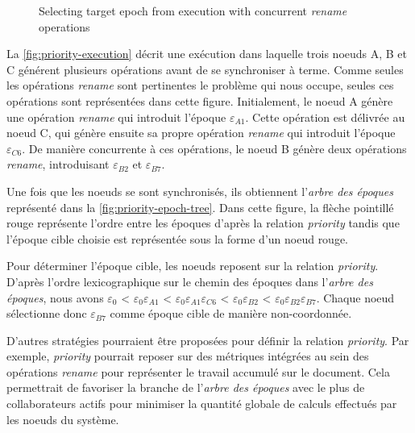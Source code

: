 \documentclass[12pt]{thesul}
\newcommand{\epoch}[1]{$\varepsilon_{#1}$}
\begin{document}
\begin{figure}[!ht]
{\begin{minipage}{\linewidth}
          \label{fig:priority-epoch-tree}
      \end{minipage}}
  \caption{Selecting target epoch from execution with concurrent \emph{rename} operations}
  \label{fig:priority-example}
\end{figure}

La \autoref{fig:priority-execution} décrit une exécution dans laquelle trois noeuds A, B et C générent plusieurs opérations avant de se synchroniser à terme.
Comme seules les opérations \emph{rename} sont pertinentes le problème qui nous occupe, seules ces opérations sont représentées dans cette figure.
Initialement, le noeud A génère une opération \emph{rename} qui introduit l'époque \epoch{A1}.
Cette opération est délivrée au noeud C, qui génère ensuite sa propre opération \emph{rename} qui introduit l'époque \epoch{C6}.
De manière concurrente à ces opérations, le noeud B génère deux opérations \emph{rename}, introduisant \epoch{B2} et \epoch{B7}.

Une fois que les noeuds se sont synchronisés, ils obtiennent l'\emph{arbre des époques} représenté dans la \autoref{fig:priority-epoch-tree}.
Dans cette figure, la flèche pointillé rouge représente l'ordre entre les époques d'après la relation \emph{priority} tandis que l'époque cible choisie est représentée sous la forme d'un noeud rouge.

Pour déterminer l'époque cible, les noeuds reposent sur la relation \emph{priority}.
D'après l'ordre lexicographique sur le chemin des époques dans l'\emph{arbre des époques}, nous avons \epoch{0} < \epoch{0}\epoch{A1} < \epoch{0}\epoch{A1}\epoch{C6} < \epoch{0}\epoch{B2} < \epoch{0}\epoch{B2}\epoch{B7}.
Chaque noeud sélectionne donc \epoch{B7} comme époque cible de manière non-coordonnée.

D'autres stratégies pourraient être proposées pour définir la relation \emph{priority}.
Par exemple, \emph{priority} pourrait reposer sur des métriques intégrées au sein des opérations \emph{rename} pour représenter le travail accumulé sur le document.
Cela permettrait de favoriser la branche de l'\emph{arbre des époques} avec le plus de collaborateurs actifs pour minimiser la quantité globale de calculs effectués par les noeuds du système.
\end{document}
